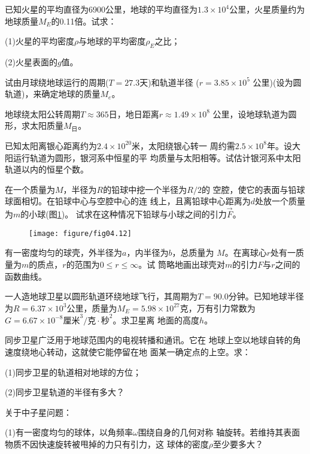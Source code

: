 \documentclass[../outline-of-mechanics.tex]{subfiles}
\begin{document}
\begin{exercises}
\exercise 已知火星的平均直径为6900公里，地球的平均直径为$ 1.3
  \times 1 0 ^ { 4 } $公里，火星质量约为地球质量$ M _ { E } $的0.11倍。试求：

(1)火星的平均密度$\rho$与地球的平均密度$ \rho _ E $之比；

(2)火星表面的$ g $值。

\exercise 试由月球绕地球运行的周期($ T = 2 7 . 3 $天)和轨道半径
($ r = 3 . 8 5 \times 1 0 ^ { 5 } $ 公里)(设为圆轨道)，来确定地球的质量$ M _ e $。

\exercise 地球绕太阳公转周期$ T \approx 3 6 5 $日，地日距离$ r \approx 1 . 4 9 \times 1 0 ^ { 8 } $
公里，设地球轨道为圆形，求太阳质量$ M _ \text{日} $。

\exercise 已知太阳离银心距离约为$ 2 . 4 \times 1 0 ^ { 2 0 } $米，太阳绕银心转一
周约需$ 2 . 5 \times 1 0 ^ { 8 } $年。设大阳运行轨道为圆形，银河系中恒星的平
均质量与太阳相等。试估计银河系中太阳轨道以内的恒星个数。

\exercise 在一个质量为$ M $，半径为$ R $的铅球中挖一个半径为$ R/2 $的
空腔，使它的表面与铅球球面相切。在铅球中心与空腔中心的连
线上，且离铅球中心距离为$ d $处放一个质量为$ m $的小球(图\ref{fig:04.12})。
试求在这种情况下铅球与小球之间的引力$ \vec{F} $。
\begin{figure}[h]
  \centering
  \texttt{[image: figure/fig04.12]}
  \caption{}
  \label{fig:04.12}
\end{figure}

\exercise 有一密度均匀的球壳，外半径为$ a $，内半径为$ b $，总质量为
$ M $。在离球心$ r $处有一质量为$ m $的质点，$ r $的范围为$ 0 \leqslant r \leqslant \infty $。试
筒略地画出球壳对$ m $的引力$ F $与$ r $之间的函数曲线。

\exercise 一人造地球卫星以圆形轨道环绕地球飞行，其周期为$ T =
  90.0 $分钟。已知地球半径为$ R = 6. 3 7 \times 1 0 ^ { 3 } \text{公里}$，质量为$ M _ { E } = 5 . 9 8
  \times 1 0 ^ { 2 7 } \text{克}$，万有引力常数为$ G = 6 . 6 7 \times 1 0 ^ { - 8 } \text{厘米} ^3 /\text{克} \cdot \text{秒} ^2 $。求卫星离
地面的高度$ h $。

\exercise 同步卫星广泛用于地球范围内的电视转播和通讯。它在
地球上空以地球自转的角速度绕地心转动，这就使它能停留在地
面某一确定点的上空。求：

(1)同步卫星的轨道相对地球的方位；

(2)同步卫星轨道的半径有多大？

\exercise 关于中子星问题：

(1)有一密度均匀的球体，以角频率$ \omega $围绕自身的几何对称
轴旋转。若维持其表面物质不因快速旋转被甩掉的力只有引力，这
球体的密度$ \rho $至少要多大？


\end{exercises}
\end{document}
